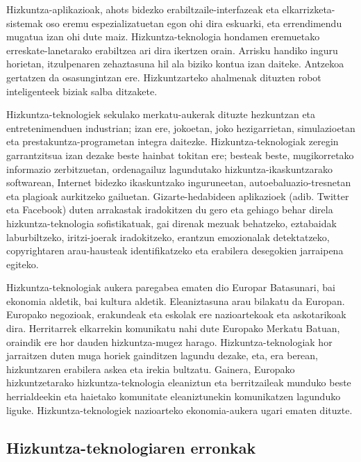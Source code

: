 \begin{multicols}{2}
Hizkuntza-aplikazioak, ahots bidezko erabiltzaile-interfazeak eta elkarrizketa-sistemak oso eremu espezializatuetan egon ohi dira eskuarki, eta errendimendu mugatua izan ohi dute maiz. Hizkuntza-teknologia hondamen eremuetako erreskate-lanetarako erabiltzea ari dira ikertzen orain. Arrisku handiko inguru horietan, itzulpenaren zehaztasuna hil ala biziko kontua izan daiteke. Antzekoa gertatzen da osasungintzan ere. Hizkuntzarteko ahalmenak dituzten robot inteligenteek biziak salba ditzakete. 

Hizkuntza-teknologiek sekulako merkatu-aukerak dituzte hezkuntzan eta entretenimenduen industrian; izan ere, jokoetan, joko hezigarrietan, simulazioetan eta prestakuntza-programetan integra daitezke. Hizkuntza-teknologiak zeregin garrantzitsua izan dezake beste hainbat tokitan ere; besteak beste, mugikorretako informazio zerbitzuetan, ordenagailuz lagundutako hizkuntza-ikaskuntzarako softwarean, Internet bidezko ikaskuntzako inguruneetan, autoebaluazio-tresnetan eta plagioak aurkitzeko gailuetan. Gizarte-hedabideen aplikazioek (adib. Twitter eta Facebook) duten arrakastak iradokitzen du gero eta gehiago behar direla hizkuntza-teknologia sofistikatuak, gai direnak mezuak behatzeko, eztabaidak laburbiltzeko, iritzi-joerak iradokitzeko, erantzun emozionalak detektatzeko, copyrightaren arau-hausteak identifikatzeko eta erabilera desegokien jarraipena egiteko.


Hizkuntza-teknologiak aukera paregabea ematen dio Europar Batasunari, bai ekonomia aldetik, bai kultura aldetik. Eleaniztasuna arau bilakatu da Europan. Europako negozioak, erakundeak eta eskolak ere nazioartekoak eta askotarikoak dira. Herritarrek elkarrekin komunikatu nahi dute Europako Merkatu Batuan, oraindik ere hor dauden hizkuntza-mugez harago. Hizkuntza-teknologiak hor jarraitzen duten muga horiek gainditzen lagundu dezake, eta, era berean, hizkuntzaren erabilera askea eta irekia bultzatu. Gainera, Europako hizkuntzetarako hizkuntza-teknologia eleaniztun eta berritzaileak munduko beste herrialdeekin eta haietako komunitate eleaniztunekin komunikatzen lagunduko liguke. Hizkuntza-teknologiek nazioarteko ekonomia-aukera ugari ematen dituzte. 

\subsection{Hizkuntza-teknologiaren erronkak}


\end{multicols}
